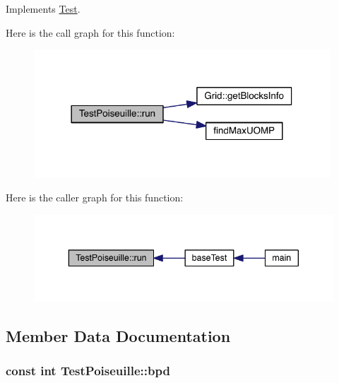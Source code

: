 Implements \hyperlink{class_test_a7e98fbe7ebf3acede5ee3fed91de3c6a}{Test}.



Here is the call graph for this function\+:\nopagebreak
\begin{figure}[H]
\begin{center}
\leavevmode
\includegraphics[width=314pt]{d1/d38/class_test_poiseuille_a510e8d1aba9e36232f0b2ab8fffad3db_cgraph}
\end{center}
\end{figure}




Here is the caller graph for this function\+:\nopagebreak
\begin{figure}[H]
\begin{center}
\leavevmode
\includegraphics[width=343pt]{d1/d38/class_test_poiseuille_a510e8d1aba9e36232f0b2ab8fffad3db_icgraph}
\end{center}
\end{figure}




\subsection{Member Data Documentation}
\hypertarget{class_test_poiseuille_a368bcc1b6b25f4fde19cbfdb606403d9}{}
\subsubsection[{bpd}]{\setlength{\rightskip}{0pt plus 5cm}const int Test\+Poiseuille\+::bpd\hspace{0.3cm}{\ttfamily [protected]}}\label{class_test_poiseuille_a368bcc1b6b25f4fde19cbfdb606403d9}
\hypertarget{class_test_poiseuille_a54e0785218e3e68132f9871f653867b7}{}
